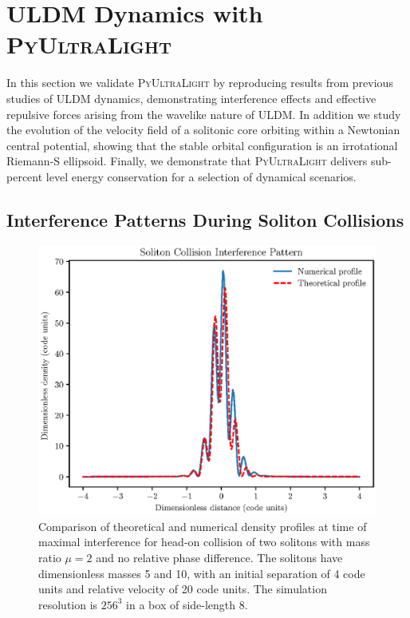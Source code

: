\documentclass[a4paper,11pt]{article}
\newcommand{\PyUltraLight}{\textsc{PyUltraLight}\xspace}
\begin{document}
\section{ULDM Dynamics with \PyUltraLight}\label{sec:test}

In this section we validate \PyUltraLight by reproducing results from previous studies of ULDM dynamics, demonstrating interference effects and effective repulsive forces arising from the wavelike nature of ULDM. In addition we study the evolution of the velocity field of a solitonic core orbiting within a Newtonian central potential, showing that the stable orbital configuration is an irrotational Riemann-S ellipsoid. Finally, we demonstrate that \PyUltraLight delivers sub-percent level energy conservation for a selection of dynamical scenarios.

\subsection{Interference Patterns During Soliton Collisions}\label{sec:interference}


\begin{figure}
  \includegraphics[trim={0 0 0 0.9cm},clip, scale=0.9]{interference_patterns}
  \caption{Comparison of theoretical and numerical density profiles at time of maximal interference for head-on collision of two solitons with mass ratio $\mu=2$ and no relative phase difference. The solitons have dimensionless masses 5 and 10, with an initial separation of 4 code units and relative velocity of 20 code units. The simulation resolution is $256^3$ in a box of side-length 8.}
  \label{fig:interference}
\end{figure}
\end{document}

